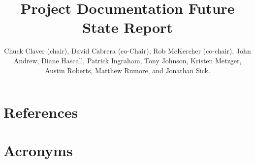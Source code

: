 \documentclass[SE,authoryear,toc]{lsstdoc}
\title{Project Documentation Future State Report}
\author{%
Chuck Claver (chair),
David Cabrera (co-Chair),
Rob McKercher (co-chair),
John Andrew,
Diane Hascall,
Patrick Ingraham,
Tony Johnson,
Kristen Metzger,
Austin Roberts,
Matthew Rumore, and 
Jonathan Sick.
}
\date{\vcsDate}
\begin{document}
\maketitle





	
	
	


	
	
	
	
	
	
	

	

	


\appendix
\section{References} \label{sec:bib}
\renewcommand{\refname}{} %


\section{Acronyms} \label{sec:acronyms}

\end{document}
